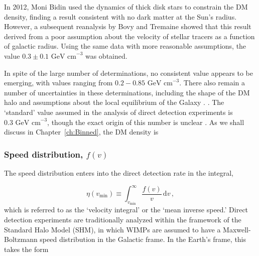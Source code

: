 In 2012, Moni Bidin \etal \cite{Moni-Bidin:2012} used the dynamics of thick disk stars to constrain the DM density, finding a result consistent with no dark matter at the Sun's radius. However, a subsequent reanalysis by Bovy and Tremaine \cite{Bovy:2012} showed that this result derived from a poor assumption about the velocity of stellar tracers as a function of galactic radius. Using the same data with more reasonable assumptions, the value $0.3 \pm 0.1 \textrm{ GeV cm}^{-3}$ was obtained. 

In spite of the large number of determinations, no consistent value appears to be emerging, with values ranging from $0.2 - 0.85 \textrm{ GeV cm}^{-3}$. There also remain a number of uncertainties in these determinations, including the shape of the DM halo \cite{} and assumptions about the local equilibrium of the Galaxy \cite{}. . The `standard' value assumed in the analysis of direct detection experiments is $0.3 \textrm{ GeV cm}^{-3}$, though the exact origin of this number is unclear \cite{Green:2012}. As we shall discuss in Chapter~\ref{ch:Binned}, the DM density is 



\subsubsection{Speed distribution, $f(v)$}

The speed distribution enters into the direct detection rate in the integral,

\begin{equation}
\eta(v_\textrm{min}) \equiv \int_{v_\textrm{min}}^\infty \frac{f(v)}{v} \, \mathrm{d}v\,,
\end{equation}
which is referred to as the `velocity integral' or the `mean inverse speed.' Direct detection experiments are traditionally analyzed within the framework of the Standard Halo Model (SHM), in which WIMPs are assumed to have a Maxwell-Boltzmann speed distribution in the Galactic frame.  In the Earth's frame, this takes the form 

